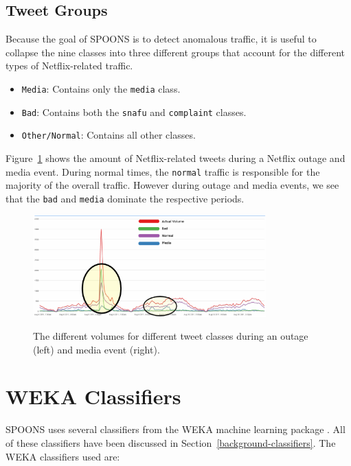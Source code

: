 \documentclass[12pt]{ucthesis}
\newcommand{\captionfonts}{\small\bf\ssp}
\begin{document}
\subsection{Tweet Groups}
\label{class-tweet-groups}
Because the goal of SPOONS is to detect anomalous traffic, it is useful to collapse the nine classes into
three different groups that account for the different types of Netflix-related traffic.

\begin{itemize}
  \item \texttt{Media}: Contains only the \texttt{media} class.
  \item \texttt{Bad}: Contains both the \texttt{snafu} and \texttt{complaint} classes.
  \item \texttt{Other/Normal}: Contains all other classes.
\end{itemize}

Figure~\ref{fig:groups} shows the amount of Netflix-related tweets during a Netflix outage and media event.
During normal times, the \texttt{normal} traffic is responsible for the majority of the overall traffic.
However during outage and media events, we see that the \texttt{bad} and \texttt{media} dominate the respective
periods.

\begin{figure}
   \begin{center}
      \includegraphics[width=0.8\textwidth]{images/groups.eps}
      \captionfonts
      \caption[SPOONS Groups]{The different volumes for different tweet classes during an outage (left) and media event (right).}
      \label{fig:groups}
   \end{center}
\end{figure}

\section{WEKA Classifiers}
\label{class-weka}
SPOONS uses several classifiers from the WEKA machine learning package \cite{weka}.
All of these classifiers have been discussed in Section~\ref{background-classifiers}.
The WEKA classifiers used are:
\end{document}
